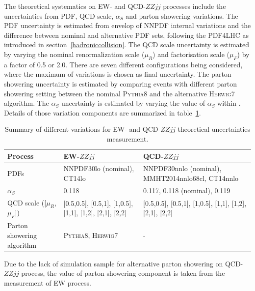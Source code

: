 The theoretical systematics on EW- and QCD-$ZZjj$ processes include the uncertainties from PDF, QCD scale, $\alpha_{S}$ and parton showering variations.
The PDF uncertainty is estimated from envelop of NNPDF internal variations and the difference between nominal and alternative PDF sets, following the PDF4LHC as introduced in section~\ref{hadroniccollision}.
The QCD scale uncertainty is estimated by varying the nominal renormalization scale ($\mu_{R}$) and factorisation scale ($\mu_{F}$) by a factor of 0.5 or 2.0.
There are seven different configurations being considered, where the maximum of variations is chosen as final uncertainty.
The parton showering uncertainty is estimated by comparing events with different parton showering setting between the nominal \textsc{Pythia8} and the alternative \textsc{Herwig7}\cite{Bellm:2015jjp, Bahr:2008pv} algorithm.
The $\alpha_{S}$ uncertainty is estimated by varying the value of $\alpha_{S}$ within .
Details of those variation components are summarized in table~\ref{tab:syst_theo_uncer}.
\begin{table}[!htb]
\small
\begin{center}
\begin{tabular}{p{5cm}p{5cm}p{5cm}} 
\hline\hline
Process     & EW-$ZZjj$   & QCD-$ZZjj$ \\
\hline
PDFs        & NNPDF30lo (nominal), CT14lo & NNPDF30nnlo (nominal), MMHT2014nnlo68cl, CT14nnlo \\
\hline
$\alpha_{S}$ & 0.118 & 0.117, 0.118 (nominal), 0.119 \\
\hline
QCD scale ([$\mu_{R}$, $\mu_{F}$]) & [0.5,0.5], [0.5,1], [1,0.5], [1,1], [1,2], [2,1], [2,2] & [0.5,0.5], [0.5,1], [1,0.5], [1,1], [1,2], [2,1], [2,2] \\
\hline 
Parton showering algorithm & \textsc{Pythia8}, \textsc{Herwig7} & - \\
\hline\hline
\end{tabular}
\caption{
Summary of different variations for EW- and QCD-$ZZjj$ theoretical uncertainties measurement.
}
\label{tab:syst_theo_uncer}
\end{center}
\end{table}
Due to the lack of simulation sample for alternative parton showering on QCD-$ZZjj$ process, 
the value of parton showering component is taken from the measurement of EW process.

